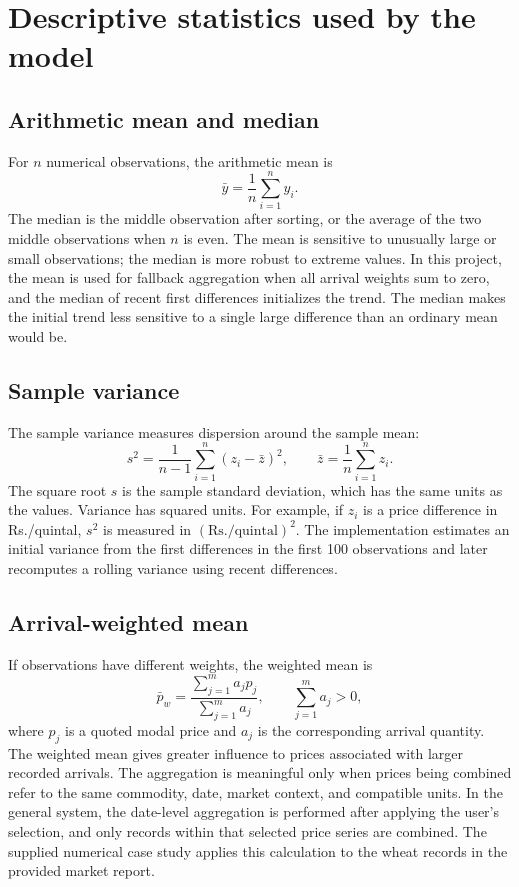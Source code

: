 \documentclass[12pt,a4paper,oneside]{report}
\numberwithin{equation}{chapter}
\numberwithin{figure}{chapter}
\numberwithin{table}{chapter}
\theoremstyle{definition}
\theoremstyle{plain}
\newcommand{\1}{\mathbf{1}}
\begin{document}
\section{Descriptive statistics used by the model}
\subsection{Arithmetic mean and median}
For $n$ numerical observations, the arithmetic mean is
\begin{equation}
  \bar y = \frac{1}{n}\sum_{i=1}^{n} y_i.
\end{equation}
The median is the middle observation after sorting, or the average of the two middle observations when $n$ is even. The mean is sensitive to unusually large or small observations; the median is more robust to extreme values. In this project, the mean is used for fallback aggregation when all arrival weights sum to zero, and the median of recent first differences initializes the trend. The median makes the initial trend less sensitive to a single large difference than an ordinary mean would be.

\subsection{Sample variance}
The sample variance measures dispersion around the sample mean:
\begin{equation}
  s^2 = \frac{1}{n-1}\sum_{i=1}^{n}(z_i-\bar z)^2,
  \qquad \bar z=\frac{1}{n}\sum_{i=1}^{n}z_i.
  \label{eq:samplevar}
\end{equation}
The square root $s$ is the sample standard deviation, which has the same units as the values. Variance has squared units. For example, if $z_i$ is a price difference in Rs./quintal, $s^2$ is measured in $(\text{Rs./quintal})^2$. The implementation estimates an initial variance from the first differences in the first 100 observations and later recomputes a rolling variance using recent differences.

\subsection{Arrival-weighted mean}
If observations have different weights, the weighted mean is
\begin{equation}
  \bar p_w = \frac{\sum_{j=1}^{m} a_jp_j}{\sum_{j=1}^{m}a_j},
  \qquad \sum_{j=1}^{m}a_j>0,
  \label{eq:weightedmean}
\end{equation}
where $p_j$ is a quoted modal price and $a_j$ is the corresponding arrival quantity. The weighted mean gives greater influence to prices associated with larger recorded arrivals. The aggregation is meaningful only when prices being combined refer to the same commodity, date, market context, and compatible units. In the general system, the date-level aggregation is performed after applying the user's selection, and only records within that selected price series are combined. The supplied numerical case study applies this calculation to the wheat records in the provided market report.
\end{document}
